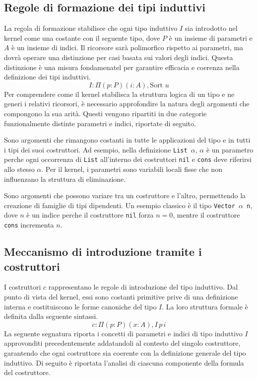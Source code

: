 \subsection{Regole di formazione dei tipi induttivi} %
La regola di formazione stabilisce che ogni tipo induttivo $I$ sia introdotto nel kernel come una costante con il seguente tipo, dove $P$ è un 
insieme di parametri e $A$ è un insieme di indici. Il ricorsore sarà polimorfico rispetto ai parametri, ma dovrà operare una distinzione per casi 
basata sui valori degli indici. Questa distinzione è una misura fondamenatel per garantire efficacia e coerenza nella definizione dei tipi induttivi.
\begin{equation}
    I : \Pi (p : P) (i : A), \text{Sort } u
    \label{eq:inductive_formula}
\end{equation}
Per comprendere come il kernel stabilisca la struttura logica di un tipo e ne generi i relativi ricorsori, è necessario approfondire la natura degli 
argomenti che compongono la sua arità. Questi vengono ripartiti in due categorie funzionalmente distinte parametri e indici, riportate di seguito.
\begin{description}[leftmargin=1.5em, style=nextline, font=\bfseries]
    \item [Parametri ($p : P$)]
        Sono argomenti che rimangono costanti in tutte le applicazioni del tipo e in tutti i tipi dei suoi costruttori. 
        Ad esempio, nella definizione \texttt{List $\alpha$}, $\alpha$ è un parametro perche ogni occorrenza di \texttt{List} 
        all'interno dei costruttori \texttt{nil} e \texttt{cons} deve riferirsi allo stesso $\alpha$. Per il kernel, i parametri 
        sono variabili locali fisse che non influenzano la struttura di eliminazione.
    \item [Indici ($i : A$)]
        Sono argomenti che possono variare tra un costruttore e l'altro, permettendo la creazione di famiglie di tipi dipendenti. 
        Un esempio classico è il tipo \texttt{Vector $\alpha$ n}, dove $n$ è un indice perche il costruttore \texttt{nil} forza 
        $n=0$, mentre il costruttore \texttt{cons} incrementa $n$.
\end{description}

\subsection{Meccanismo di introduzione tramite i costruttori}
I costruttori $c$ rappresentano le regole di introduzione del tipo induttivo. Dal punto di vista del kernel, essi sono costanti primitive prive 
di una definizione interna e costituiscono le forme canoniche del tipo $I$. La loro struttura formale è definita dalla seguente sintassi.
\begin{equation}
    c : \Pi (p : P) (x : A), I \, p \, i
    \label{eq:constructor_formula}
\end{equation}
La seguente segnatura riporta i concetti di parametri e indici di tipo induttivo $I$ approvonditi precedentemente addatandoli al contesto del singolo
costruttore, garantendo che ogni costruttore sia coerente con la definizione generale del tipo induttivo. Di seguito è riportata l'analisi di ciascuna
componente della formula del costruttore.

